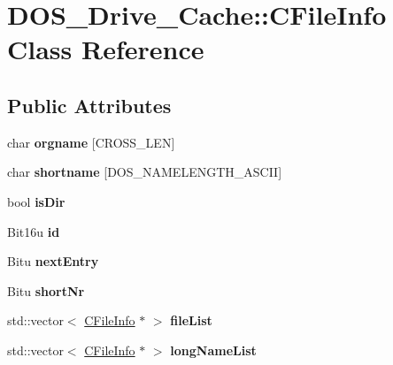 \hypertarget{classDOS__Drive__Cache_1_1CFileInfo}{\section{D\-O\-S\-\_\-\-Drive\-\_\-\-Cache\-:\-:C\-File\-Info Class Reference}
\label{classDOS__Drive__Cache_1_1CFileInfo}
}
\subsection*{Public Attributes}
\begin{DoxyCompactItemize}
\item 
\hypertarget{classDOS__Drive__Cache_1_1CFileInfo_a54e3d2f75fcbb74f75db034953e229a3}{char {\bfseries orgname} \mbox{[}C\-R\-O\-S\-S\-\_\-\-L\-E\-N\mbox{]}}\label{classDOS__Drive__Cache_1_1CFileInfo_a54e3d2f75fcbb74f75db034953e229a3}

\item 
\hypertarget{classDOS__Drive__Cache_1_1CFileInfo_a4bc96390314c8e5458bdb6fca24526e5}{char {\bfseries shortname} \mbox{[}D\-O\-S\-\_\-\-N\-A\-M\-E\-L\-E\-N\-G\-T\-H\-\_\-\-A\-S\-C\-I\-I\mbox{]}}\label{classDOS__Drive__Cache_1_1CFileInfo_a4bc96390314c8e5458bdb6fca24526e5}

\item 
\hypertarget{classDOS__Drive__Cache_1_1CFileInfo_a5fd697ccc70ceb461b00ac5e0a3b0a6a}{bool {\bfseries is\-Dir}}\label{classDOS__Drive__Cache_1_1CFileInfo_a5fd697ccc70ceb461b00ac5e0a3b0a6a}

\item 
\hypertarget{classDOS__Drive__Cache_1_1CFileInfo_a7431fc652afc211a9f5688d3dc6dac54}{Bit16u {\bfseries id}}\label{classDOS__Drive__Cache_1_1CFileInfo_a7431fc652afc211a9f5688d3dc6dac54}

\item 
\hypertarget{classDOS__Drive__Cache_1_1CFileInfo_a070341474c5331b61978b1fa4e397fba}{Bitu {\bfseries next\-Entry}}\label{classDOS__Drive__Cache_1_1CFileInfo_a070341474c5331b61978b1fa4e397fba}

\item 
\hypertarget{classDOS__Drive__Cache_1_1CFileInfo_aabcdb2db6a8c70ad16109e5662141f61}{Bitu {\bfseries short\-Nr}}\label{classDOS__Drive__Cache_1_1CFileInfo_aabcdb2db6a8c70ad16109e5662141f61}

\item 
\hypertarget{classDOS__Drive__Cache_1_1CFileInfo_a5470a346a90b401ea29fb40645aad237}{std\-::vector$<$ \hyperlink{classDOS__Drive__Cache_1_1CFileInfo}{C\-File\-Info} $\ast$ $>$ {\bfseries file\-List}}\label{classDOS__Drive__Cache_1_1CFileInfo_a5470a346a90b401ea29fb40645aad237}

\item 
\hypertarget{classDOS__Drive__Cache_1_1CFileInfo_a5cfea8ee640dc9b5f1808a52bc0781d9}{std\-::vector$<$ \hyperlink{classDOS__Drive__Cache_1_1CFileInfo}{C\-File\-Info} $\ast$ $>$ {\bfseries long\-Name\-List}}\label{classDOS__Drive__Cache_1_1CFileInfo_a5cfea8ee640dc9b5f1808a52bc0781d9}

\end{DoxyCompactItemize}


